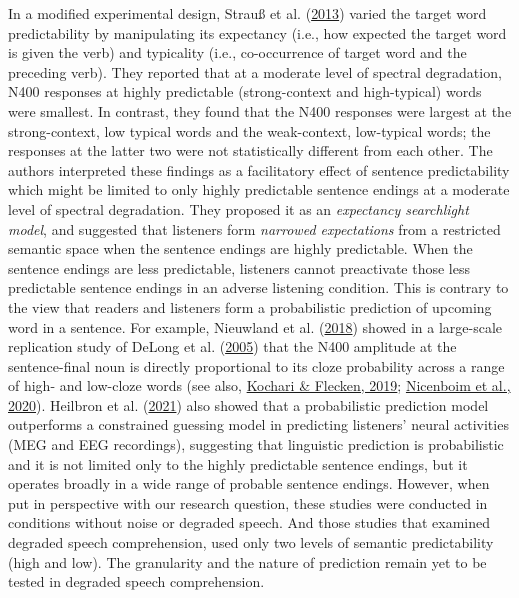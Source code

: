 \documentclass[a4paper, nobind]{templates/ociamthesis}
\begin{document}
In a modified experimental design, Strauß et al. (\protect\hyperlink{ref-Strauss2013}{2013}) varied the target word predictability by manipulating its expectancy (i.e., how expected the target word is given the verb) and typicality (i.e., co-occurrence of target word and the preceding verb).
They reported that at a moderate level of spectral degradation, N400 responses at highly predictable (strong-context and high-typical) words were smallest.
In contrast, they found that the N400 responses were largest at the strong-context, low typical words and the weak-context, low-typical words;
the responses at the latter two were not statistically different from each other.
The authors interpreted these findings as a facilitatory effect of sentence predictability which might be limited to only highly predictable sentence endings at a moderate level of spectral degradation.
They proposed it as an \emph{expectancy searchlight model}, and suggested that listeners form \emph{narrowed expectations} from a restricted semantic space when the sentence endings are highly predictable.
When the sentence endings are less predictable, listeners cannot preactivate those less predictable sentence endings in an adverse listening condition.
This is contrary to the view that readers and listeners form a probabilistic prediction of upcoming word in a sentence.
For example, Nieuwland et al. (\protect\hyperlink{ref-Nieuwland2018}{2018}) showed in a large-scale replication study of DeLong et al. (\protect\hyperlink{ref-Delong2005}{2005}) that the N400 amplitude at the sentence-final noun is directly proportional to its cloze probability across a range of high- and low-cloze words (see also, \protect\hyperlink{ref-Kochari2019}{Kochari \& Flecken, 2019}; \protect\hyperlink{ref-Nicenboim2020}{Nicenboim et al., 2020}).
Heilbron et al. (\protect\hyperlink{ref-Heilbron2021}{2021}) also showed that a probabilistic prediction model outperforms a constrained guessing model in predicting listeners' neural activities (MEG and EEG recordings),
suggesting that linguistic prediction is probabilistic and it is not limited only to the highly predictable sentence endings, but it operates broadly in a wide range of probable sentence endings.
However, when put in perspective with our research question, these studies were conducted in conditions without noise or degraded speech.
And those studies that examined degraded speech comprehension, used only two levels of semantic predictability (high and low).
The granularity and the nature of prediction remain yet to be tested in degraded speech comprehension.
\end{document}
